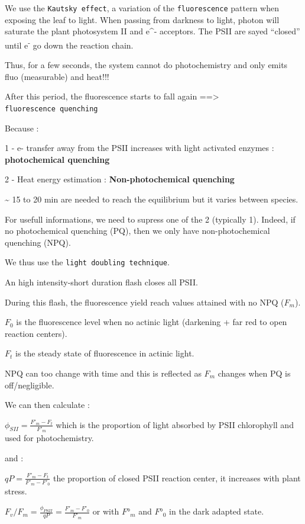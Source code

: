\documentclass[
  12pt,
  american,
  a4paper,
  extrafontsizes,onecolumn,openright
  ]{memoir}
\begin{document}
We use the \texttt{Kautsky\ effect}, a variation of the \texttt{fluorescence} pattern when exposing the leaf to light.
When passing from darkness to light, photon will saturate the plant photosystem II and e\^{}- acceptors.
The PSII are sayed ``closed'' until e\textsuperscript{-} go down the reaction chain.

Thus, for a few seconds, the system cannot do photochemistry and only emits fluo (measurable) and heat!!!

After this period, the fluorescence starts to fall again ==\textgreater{} \texttt{fluorescence\ quenching}

Because :

1 - e- transfer away from the PSII increases with light activated enzymes : \textbf{photochemical quenching}

2 - Heat energy estimation : \textbf{Non-photochemical quenching}

\textasciitilde{} 15 to 20 min are needed to reach the equilibrium but it varies between species.

For usefull informations, we need to supress one of the 2 (typically 1).
Indeed, if no photochemical quenching (PQ), then we only have non-photochemical quenching (NPQ).

We thus use the \texttt{light\ doubling\ technique}.

An high intensity-short duration flash closes all PSII.

During this flash, the fluorescence yield reach values attained with no NPQ (\(F_m\)).

\(F_0\) is the fluorescence level when no actinic light (darkening + far red to open reaction centers).

\(F_t\) is the steady state of fluorescence in actinic light.

NPQ can too change with time and this is reflected as \(F_m\) changes when PQ is off/negligible.

We can then calculate :

\(\phi _{SII} = \frac{F'_m-F_t}{F'_m}\) which is the proportion of light absorbed by PSII chlorophyll and used for photochemistry.

and :

\(qP = \frac{F'_m-F_t}{F'_m-F'_0}\) the proportion of closed PSII reaction center, it increases with plant stress.

\(F_v/F_m=\frac{\phi _{PSII}}{qP}=\frac{F'_m-F'_0}{F'_m}\) or with \(F°_m\) and \(F°_0\) in the dark adapted state.
\end{document}
